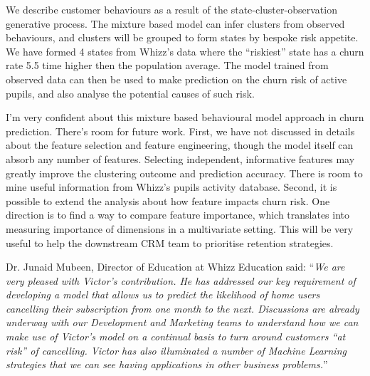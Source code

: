\documentclass[english,a4,oneside,9pt]{extarticle}
\begin{document}
We describe customer behaviours as a result of the state-cluster-observation generative process. The mixture based model can infer clusters from observed behaviours, and clusters will be grouped to form states by bespoke risk appetite. We have formed 4 states from Whizz's data where the ``riskiest'' state has a churn rate 5.5 time higher then the population average. The model trained from observed data can then be used to make prediction on the churn risk of active pupils, and also analyse the potential causes of such risk.

I'm very confident about this mixture based behavioural model approach in churn prediction. There's room for future work. First, we have not discussed in details about the feature selection and feature engineering, though the model itself can absorb any number of features. Selecting independent, informative features may greatly improve the clustering outcome and prediction accuracy. There is room to mine useful information from Whizz's pupils activity database. Second, it is possible to extend the analysis about how feature impacts churn risk. One direction is to find a way to compare feature importance, which translates into measuring importance of dimensions in a multivariate setting. This will be very useful to help the downstream CRM team to prioritise retention strategies.  

Dr. Junaid Mubeen, Director of Education at Whizz Education said: ``\emph{We are very pleased with Victor's contribution. He has addressed our key requirement of developing a model that allows us to predict the likelihood of home users cancelling their subscription from one month to the next. Discussions are already underway with our Development and Marketing teams to understand how we can make use of Victor's model on a continual basis to turn around customers ``at risk'' of cancelling. Victor has also illuminated a number of Machine Learning strategies that we can see having applications in other business problems.}''


%
\end{document}
